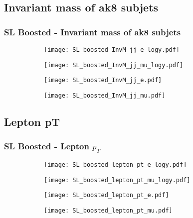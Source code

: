 \documentclass[aspectratio=169,8pt]{beamer}
\begin{document}
\subsection{Invariant mass of ak8 subjets}
\begin{frame}
\frametitle{SL Boosted - Invariant mass of ak8 subjets}
\begin{figure}
\captionsetup[subfigure]{labelformat=empty}
\begin{subfigure}{0.375\textwidth}
\texttt{[image: SL\_boosted\_InvM\_jj\_e\_logy.pdf]}
\vspace*{-0.15cm}
\end{subfigure}
\hfil
\begin{subfigure}{0.375\textwidth}
\texttt{[image: SL\_boosted\_InvM\_jj\_mu\_logy.pdf]}
\vspace*{-0.15cm}
\end{subfigure}
\hfil
\begin{subfigure}{0.375\textwidth}
\texttt{[image: SL\_boosted\_InvM\_jj\_e.pdf]}
\vspace*{-0.15cm}
\end{subfigure}
\hfil
\begin{subfigure}{0.375\textwidth}
\texttt{[image: SL\_boosted\_InvM\_jj\_mu.pdf]}
\vspace*{-0.15cm}
\end{subfigure}
\hfil
\end{figure}
\end{frame}
\newpage

\subsection{Lepton pT}
\begin{frame}
\frametitle{SL Boosted - Lepton $p_{T}$}
\begin{figure}
\captionsetup[subfigure]{labelformat=empty}
\begin{subfigure}{0.375\textwidth}
\texttt{[image: SL\_boosted\_lepton\_pt\_e\_logy.pdf]}
\vspace*{-0.15cm}
\end{subfigure}
\hfil
\begin{subfigure}{0.375\textwidth}
\texttt{[image: SL\_boosted\_lepton\_pt\_mu\_logy.pdf]}
\vspace*{-0.15cm}
\end{subfigure}
\hfil
\begin{subfigure}{0.375\textwidth}
\texttt{[image: SL\_boosted\_lepton\_pt\_e.pdf]}
\vspace*{-0.15cm}
\end{subfigure}
\hfil
\begin{subfigure}{0.375\textwidth}
\texttt{[image: SL\_boosted\_lepton\_pt\_mu.pdf]}
\vspace*{-0.15cm}
\end{subfigure}
\hfil
\end{figure}
\end{frame}
\newpage
\end{document}
